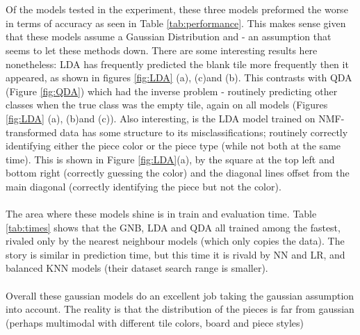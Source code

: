 \documentclass{article}
\newcommand{\PCAF}{(b)}
\newcommand{\PCAB}{(c)}
\newcommand{\NMFB}{(a)}
\begin{document}
\begin{multicols}{2}
\\\\
Of the models tested in the experiment, these three models preformed the worse in terms of accuracy as seen in Table \ref{tab:performance}. This makes sense given that these models assume a Gaussian Distribution and - an assumption that seems to let these methods down. There are some interesting results here nonetheless: LDA has frequently predicted the blank tile more frequently then it appeared, as shown in figures \ref{fig:LDA} \NMFB, \PCAB and \PCAF. This contrasts with QDA (Figure \ref{fig:QDA}) which had the inverse problem - routinely predicting other classes when the true class was the empty tile, again on all models (Figures \ref{fig:LDA} \NMFB, \PCAF and \PCAB). Also interesting, is the LDA model trained on NMF-transformed data has some structure to its misclassifications; routinely correctly identifying either the piece color or the piece type (while not both at the same time). This is shown in Figure \ref{fig:LDA}\NMFB, by the square at the top left and bottom right (correctly guessing the color) and the diagonal lines offset from the main diagonal (correctly identifying the piece but not the color).
\\\\
The area where these models shine is in train and evaluation time. Table \ref{tab:times} shows that the GNB, LDA and QDA all trained among the fastest, rivaled only by the nearest neighbour models (which only copies the data). The story is similar in prediction time, but this time it is rivald by NN and LR, and balanced KNN models (their dataset search range is smaller).
\\\\
Overall these gaussian models do an excellent job taking the gaussian assumption into account. The reality is that the distribution of the pieces is far from gaussian (perhaps multimodal with different tile colors, board and piece styles)

\end{multicols}
\end{document}
